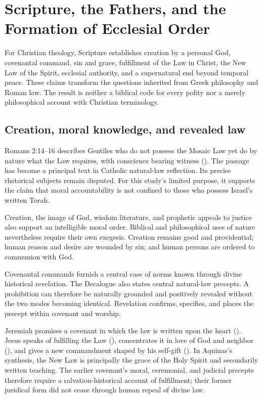 \section{Scripture, the Fathers, and the Formation of Ecclesial Order}

For Christian theology, Scripture establishes creation by a personal God, covenantal command, sin and grace, fulfillment of the Law in Christ, the New Law of the Spirit, ecclesial authority, and a supernatural end beyond temporal peace. These claims transform the questions inherited from Greek philosophy and Roman law. The result is neither a biblical code for every polity nor a merely philosophical account with Christian terminology.

\subsection{Creation, moral knowledge, and revealed law}

Romans 2:14--16 describes Gentiles who do not possess the Mosaic Law yet do by nature what the Law requires, with conscience bearing witness (). The passage has become a principal text in Catholic natural-law reflection. Its precise rhetorical subjects remain disputed. For this study's limited purpose, it supports the claim that moral accountability is not confined to those who possess Israel's written Torah.

Creation, the image of God, wisdom literature, and prophetic appeals to justice also support an intelligible moral order. Biblical and philosophical uses of nature nevertheless require their own exegesis. Creation remains good and providential; human reason and desire are wounded by sin; and human persons are ordered to communion with God.

Covenantal commands furnish a central case of norms known through divine historical revelation. The Decalogue also states central natural-law precepts. A prohibition can therefore be naturally grounded and positively revealed without the two modes becoming identical. Revelation confirms, specifies, and places the precept within covenant and worship.

Jeremiah promises a covenant in which the law is written upon the heart (). Jesus speaks of fulfilling the Law (), concentrates it in love of God and neighbor (), and gives a new commandment shaped by his self-gift (). In Aquinas's synthesis, the New Law is principally the grace of the Holy Spirit and secondarily written teaching. The earlier covenant's moral, ceremonial, and judicial precepts therefore require a salvation-historical account of fulfillment; their former juridical form did not cease through human repeal of divine law.

